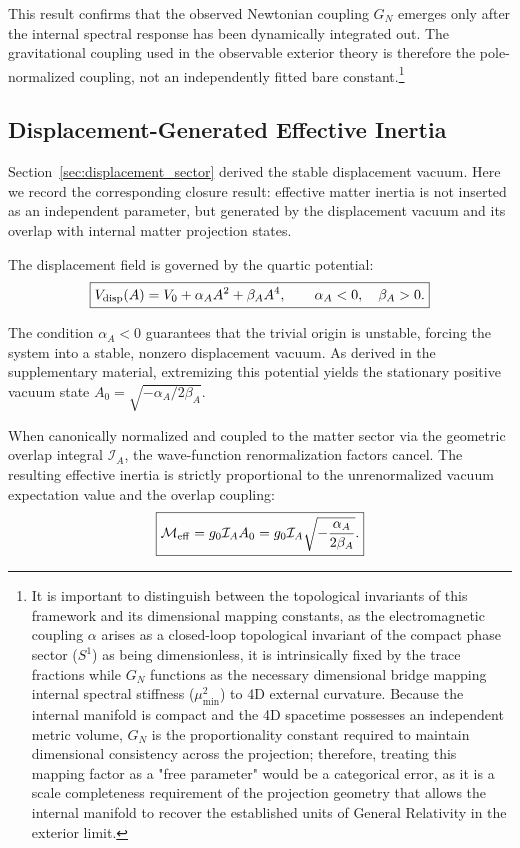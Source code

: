 \documentclass[11pt]{article}
\begin{document}
This result confirms that the observed Newtonian coupling $G_N$ emerges only after the internal spectral response has been dynamically integrated out. The
gravitational coupling used in the observable exterior theory is therefore the
pole-normalized coupling, not an independently fitted bare constant.\footnote{It is important to distinguish between the topological invariants of this framework and its dimensional mapping constants, as the electromagnetic coupling $\alpha$ arises as a closed-loop topological invariant of the compact phase sector ($S^1$) as being dimensionless, it is intrinsically fixed by the trace fractions while $G_N$ functions as the necessary dimensional bridge mapping internal spectral stiffness ($\mu_{\min}^2$) to 4D external curvature. Because the internal manifold is compact and the 4D spacetime possesses an independent metric volume, $G_N$ is the proportionality constant required to maintain dimensional consistency across the projection; therefore, treating this mapping factor as a "free parameter" would be a categorical error, as it is a scale completeness requirement of the projection geometry that allows the internal manifold to recover the established units of General Relativity in the exterior limit.} 

\subsection{Displacement-Generated Effective Inertia}
\label{sec:displacement_generated_effective_inertia}
Section~\ref{sec:displacement_sector} derived the stable displacement vacuum.
Here we record the corresponding closure result: effective matter inertia is not
inserted as an independent parameter, but generated by the displacement vacuum
and its overlap with internal matter projection states.

The displacement field is governed by the quartic potential:
\begin{equation}
\boxed{
V_{\rm disp}(A)
=
V_0+\alpha_AA^2+\beta_AA^4,
\qquad
\alpha_A<0, \quad \beta_A>0.
}
\end{equation}

The condition $\alpha_A < 0$ guarantees that the trivial origin is unstable, forcing the system into a stable, nonzero displacement vacuum. As derived in the supplementary material, extremizing this potential yields the stationary positive vacuum state $A_0 = \sqrt{-\alpha_A / 2\beta_A}$.

When canonically normalized and coupled to the matter sector via the geometric overlap integral $\mathcal I_A$, the wave-function renormalization factors  cancel. The resulting effective inertia is strictly proportional to the unrenormalized vacuum expectation value and the overlap coupling:
\begin{equation}
\boxed{
\mathcal M_{\rm eff}
=
g_0\mathcal I_AA_0
=
g_0\mathcal I_A
\sqrt{
-\frac{\alpha_A}{2\beta_A}
}.
}
\end{equation}
\end{document}
